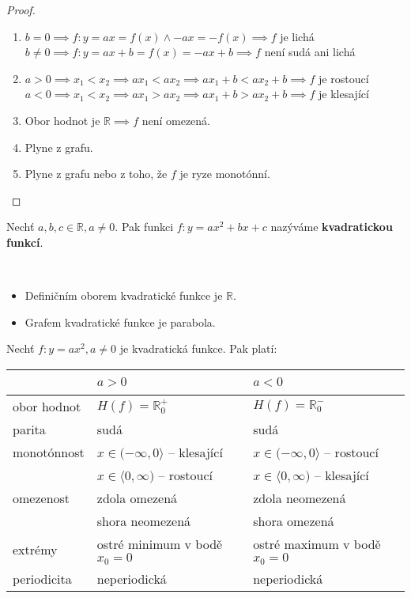 \begin{proof}\,
  \begin{enumerate}[$i.$]
    \item $b=0 \implies f:y= ax = f(x) \land -ax = -f(x) \implies f$ je lichá\\
          $b\neq 0 \implies f:y = ax + b = f(x) = -ax + b \implies f$ není sudá ani lichá
    \item $a>0 \implies x_1 < x_2 \implies ax_1 < ax_2 \implies ax_1 + b < ax_2 + b \implies f$ je rostoucí\\
          $a<0 \implies x_1 < x_2 \implies ax_1 > ax_2 \implies ax_1 + b > ax_2 + b \implies f$ je klesající
    \item Obor hodnot je $\mathbb R \implies f$ není omezená.
    \item Plyne z grafu.
    \item Plyne z grafu nebo z toho, že $f$ je ryze monotónní. \qedhere
  \end{enumerate}
\end{proof}

\begin{definition}
  Nechť $a,b,c \in \mathbb R, a \neq 0$. Pak funkci $f:y = ax^2 + bx+ c$ nazýváme \textbf{kvadratickou funkcí}.
\end{definition}

\begin{pozn}\,
  \begin{itemize}
    \item Definičním oborem kvadratické funkce je $\mathbb R$.
    \item Grafem kvadratické funkce je parabola.
  \end{itemize}
\end{pozn}

\begin{veta}
  Nechť $f:y = ax^2, a \neq 0$ je kvadratická funkce. Pak platí:
  \begin{center}
    \begin{tabularx}{\textwidth}{ l | l  l }
        \, & $a>0$ & $a<0$ \\
        \hline
        obor hodnot & $H(f) = \mathbb R^{+}_0$ & $H(f) = \mathbb R^{-}_0$ \\
        parita & sudá & sudá \\
        monotónnost & $x \in (-\infty, 0\rangle$ -- klesající & $x \in (-\infty, 0\rangle$ -- rostoucí \\
        \, & $x \in \langle 0, \infty)$ -- rostoucí & $x \in \langle 0, \infty)$ -- klesající \\
        omezenost & zdola omezená & zdola neomezená \\
        \, & shora neomezená & shora omezená \\
        extrémy &  ostré minimum v bodě $x_0=0$ & ostré maximum v bodě $x_0=0$ \\
        periodicita & neperiodická & neperiodická
    \end{tabularx}
  \end{center}
\end{veta}

